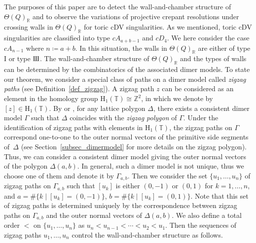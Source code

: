 \documentclass[pdftex]{sigma}
\numberwithin{equation}{section}
\theoremstyle{definition}
\newcommand{\ZZ}{\mathbb{Z}}
\newcommand{\RR}{\mathbb{R}}
\newcommand{\TT}{\mathbb{T}}
\newcommand{\rmH}{\mathrm{H}}
\newcommand{\typeIII}{{\rm I\hspace{-0.7pt}I\hspace{-0.7pt}I}}
\begin{document}
The purposes of this paper are to detect the wall-and-chamber structure of $\Theta(Q)_\RR$
and to observe the variations of projective crepant resolutions under crossing walls in $\Theta(Q)_\RR$ for toric cDV singularities.
As we mentioned, toric cDV singularities are classified into type $cA_{a+b-1}$ and $cD_4$.
We here consider the case $cA_{n-1}$ where $n\coloneqq a+b$.
In this situation, the walls in $\Theta(Q)_\RR$ are either of type I or type $\typeIII$.
The wall-and-chamber structure of $\Theta(Q)_\RR$ and the types of walls can be determined by the combinatorics of the associated dimer models.
To state our theorem, we consider a special class of paths on a dimer model called \emph{zigzag paths} (see Definition~\ref{def_zigzag}).
A zigzag path $z$ can be considered as an element in the homology group $\rmH_1(\TT)\cong\ZZ^2$, in which we denote by $[z]\in\rmH_1(\TT)$.
By \cite[Theorem~6.1]{Gul} or \cite[Corollary~1.2]{IU_special}, for any lattice polygon $\Delta$,
there exists a consistent dimer model $\Gamma$ such that $\Delta$ coincides with the \emph{zigzag polygon} of $\Gamma$.
Under the identification of zigzag paths with elements in $\rmH_1(\TT)$, the zigzag paths on $\Gamma$ correspond one-to-one to the outer normal vectors of the primitive side segments of~$\Delta$ (see Section~\ref{subsec_dimermodel} for more details on the zigzag polygon).
Thus, we can consider a consistent dimer model giving the outer normal vectors of the polygon $\Delta(a,b)$.
In general, such a dimer model is not unique, thus we choose one of them and denote it by $\Gamma_{a,b}$.
Then we consider the set $\{u_1, \dots, u_n\}$ of zigzag paths on $\Gamma_{a,b}$ such that $[u_k]$ is either $(0,-1)$ or $(0,1)$ for $k=1, \dots, n$,
and $a=\#\{k \mid [u_k]=(0,-1)\}$, $b=\#\{k \mid [u_k]=(0,1)\}$.
Note that this set of zigzag paths is determined uniquely by the correspondence between zigzag paths on $\Gamma_{a,b}$ and the outer normal vectors of $\Delta(a,b)$.
We also define a total order $<$ on $\{u_1, \dots, u_n\}$ as $u_n<u_{n-1}<\cdots< u_2< u_1$.
Then the sequences of zigzag paths $u_1, \dots, u_n$ control the wall-and-chamber structure as follows.
\end{document}
